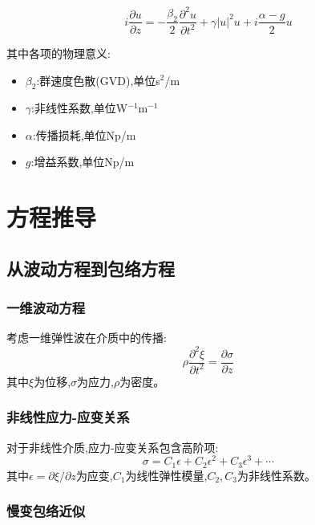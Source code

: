 \documentclass[12pt,a4paper]{article}
\theoremstyle{definition}
\begin{document}
\begin{equation}
\boxed{i\frac{\partial u}{\partial z}=-\frac{\beta_2}{2}\frac{\partial^2 u}{\partial t^2}+\gamma|u|^2u+i\frac{\alpha-g}{2}u}
\label{eq:NLSE}
\end{equation}

其中各项的物理意义:
\begin{itemize}
    \item $\beta_2$:群速度色散(GVD),单位s$^2$/m
    \item $\gamma$:非线性系数,单位W$^{-1}$m$^{-1}$
    \item $\alpha$:传播损耗,单位Np/m
    \item $g$:增益系数,单位Np/m
\end{itemize}

\section{方程推导}

\subsection{从波动方程到包络方程}

\subsubsection{一维波动方程}

考虑一维弹性波在介质中的传播:
\begin{equation}
\rho\frac{\partial^2\xi}{\partial t^2}=\frac{\partial\sigma}{\partial z}
\label{eq:wave_eq}
\end{equation}
其中$\xi$为位移,$\sigma$为应力,$\rho$为密度。

\subsubsection{非线性应力-应变关系}

对于非线性介质,应力-应变关系包含高阶项:
\begin{equation}
\sigma=C_1\epsilon+C_2\epsilon^2+C_3\epsilon^3+\cdots
\label{eq:nonlinear_stress}
\end{equation}
其中$\epsilon=\partial\xi/\partial z$为应变,$C_1$为线性弹性模量,$C_2,C_3$为非线性系数。

\subsubsection{慢变包络近似}
\end{document}
